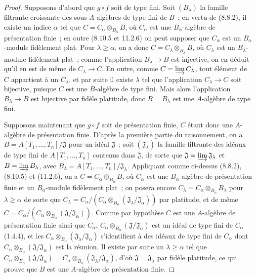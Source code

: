 \begin{proof}
Supposons d'abord que $g\circ f$ soit de type fini. Soit $(B_\lambda)$ la
famille filtrante croissante des sous-$A$-algèbres de type fini de $B$~; en
vertu de (8.8.2), il existe un indice $\alpha$ tel que
$C=C_\alpha\otimes_{B_\alpha}B$, où $C_\alpha$ est une
$B_\alpha$-algèbre de présentation finie~; en outre (8.10.5 et 11.2.6) on peut
supposer que $C_\alpha$ est un $B_\alpha$-module fidèlement plat. Pour
$\lambda\geq\alpha$, on a donc
$C=C_\lambda\otimes_{B_\lambda}B$, où $C_\lambda$ est un
$B_\lambda$-module fidèlement plat~; comme l'application $B_\lambda\to B$ est
injective, on en déduit qu'il en est de même de $C_\lambda\to C$. En outre,
comme $C=\varinjlim C_\lambda$, tout élément de $C$ appartient à un
$C_\lambda$, et par suite il existe $\lambda$ tel que l'application
$C_\lambda\to C$
soit bijective, puisque $C$ est une $B$-algèbre de type fini. Mais alors
l'application $B_\lambda\to B$ est bijective par fidèle platitude, donc
$B=B_\lambda$ est une $A$-algèbre de type fini.

Supposons maintenant que $g\circ f$ soit de présentation finie, $C$ étant donc
une $A$-algèbre de présentation finie. D'après la première partie du
raisonnement, on a
$B=A[T_1,\ldots,T_n]/\mathfrak J$
pour un idéal $\mathfrak J$~; soit
$(\mathfrak J_\lambda)$ la famille filtrante des idéaux de type
fini de $A[T_1,\ldots,T_n]$ contenus dans $\mathfrak J$, de sorte
que $\mathfrak J=\varinjlim\mathfrak J_\lambda$ et
$B=\varinjlim B_\lambda$, avec
$B_\lambda=A[T_1,\ldots,T_n]/\mathfrak J_\lambda$. Appliquant
comme ci-dessus (8.8.2), (8.10.5) et (11.2.6), on a
$C=C_\alpha\otimes_{B_\alpha}B$, où $C_\alpha$ est une
$B_\alpha$-algèbre de présentation finie et un $B_\alpha$-module fidèlement
plat~; on posera encore $C_\lambda=C_\alpha\otimes_{B_\alpha}B_\lambda$ pour
$\lambda\geq\alpha$ de sorte que
$C_\lambda=C_\alpha/(C_\alpha\otimes_{B_\alpha}
(\mathfrak J_\lambda/\mathfrak J_\alpha))$
par platitude, et de même
$C=C_\alpha/(C_\alpha\otimes_{B_\alpha}
(\mathfrak J/\mathfrak J_\alpha))$.
Comme par hypothèse $C$ est une $A$-algèbre de présentation finie ainsi que
$C_\alpha$, $C_\alpha\otimes_{B_\alpha}
(\mathfrak J/\mathfrak J_\alpha)$ est un idéal de
type fini de $C_\alpha$ (1.4.4), et les
$C_\alpha\otimes_{B_\alpha}
(\mathfrak J_\lambda/\mathfrak J_\alpha)$
s'identifient à des idéaux de type fini de $C_\alpha$ dont
$C_\alpha\otimes_{B_\alpha}
(\mathfrak J/\mathfrak J_\alpha)$ est la réunion. Il
existe par suite un $\lambda\geq\alpha$ tel que
$C_\alpha\otimes_{B_\alpha}
(\mathfrak J/\mathfrak J_\alpha)
=C_\alpha\otimes_{B_\alpha}
(\mathfrak J_\lambda/\mathfrak J_\alpha)$,
d'où $\mathfrak J=\mathfrak J_\lambda$ par fidèle
platitude, ce qui prouve que $B$ est une $A$-algèbre de présentation finie.
\end{proof}

